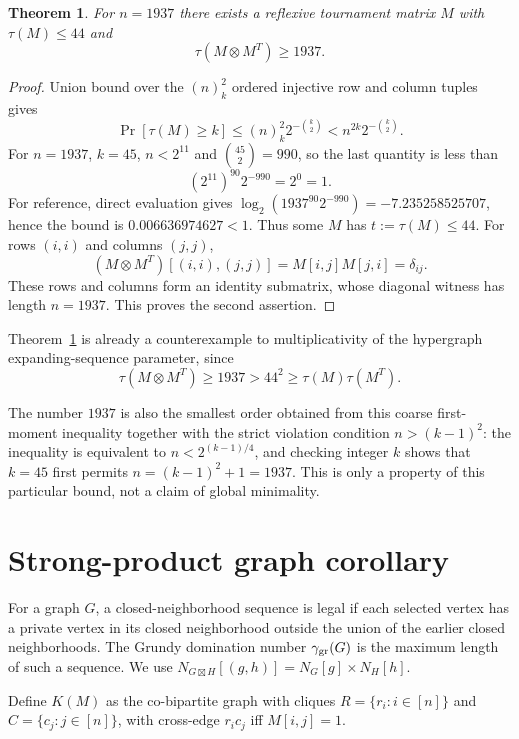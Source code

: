 \documentclass[11pt]{article}
\newtheorem{theorem}{Theorem}[section]
\newcommand{\gr}{\gamma_{\rm gr}}
\begin{document}
\begin{theorem}\label{thm:random}
For $n=1937$ there exists a reflexive tournament matrix $M$ with
$\tau(M)\le44$ and
\[\tau(M\otimes M^T)\ge1937.
\]
\end{theorem}
\begin{proof}
Union bound over the $(n)_k^2$ ordered injective row and column tuples gives
\[
 \Pr[\tau(M)\ge k]\le (n)_k^2 2^{-\binom{k}{2}}
 < n^{2k}2^{-\binom{k}{2}}.
\]
For $n=1937$, $k=45$, $n<2^{11}$ and $\binom{45}{2}=990$, so the last
quantity is less than
\[
(2^{11})^{90}2^{-990}=2^0=1.
\]
For reference, direct evaluation gives
$\log_2(1937^{90}2^{-990})=-7.235258525707$, hence the bound is
$0.006636974627<1$.
Thus some $M$ has $t:=\tau(M)\le44$.  For rows $(i,i)$ and columns $(j,j)$,
\[
(M\otimes M^T)[(i,i),(j,j)]=M[i,j]M[j,i]=\delta_{ij}.
\]
These rows and columns form an identity submatrix, whose diagonal witness has
length $n=1937$.  This proves the second assertion.
\end{proof}

Theorem~\ref{thm:random} is already a counterexample to multiplicativity of
the hypergraph expanding-sequence parameter, since
\[
\tau(M\otimes M^T)\ge1937>44^2\ge\tau(M)\tau(M^T).
\]

The number $1937$ is also the smallest order obtained from this coarse
first-moment inequality together with the strict violation condition
$n>(k-1)^2$: the inequality is equivalent to
$n<2^{(k-1)/4}$, and checking integer $k$ shows that $k=45$ first permits
$n=(k-1)^2+1=1937$.  This is only a property of this particular bound, not a
claim of global minimality.

\section{Strong-product graph corollary}

For a graph $G$, a closed-neighborhood sequence is legal if each selected
vertex has a private vertex in its closed neighborhood outside the union of
the earlier closed neighborhoods.  The Grundy domination number $\gr(G)$ is
the maximum length of such a sequence.  We use
$N_{G\boxtimes H}[(g,h)]=N_G[g]\times N_H[h]$.

Define $K(M)$ as the co-bipartite graph with cliques
$R=\{r_i:i\in[n]\}$ and $C=\{c_j:j\in[n]\}$, with cross-edge $r_ic_j$ iff
$M[i,j]=1$.
\end{document}
